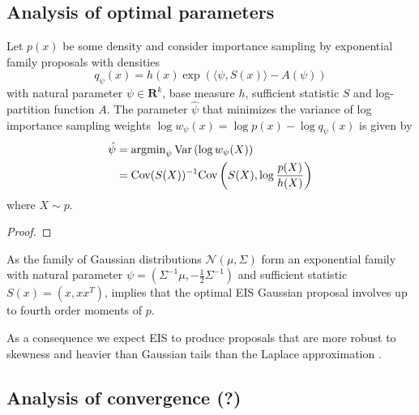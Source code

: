 \begin{tcolorbox}[title={decide what to do}]
    
\subsection{Analysis of optimal parameters}
\label{subsec:analysis_of_optimal_parameters}


\begin{theorem}
    \label{thm:optimal-eis}
    Let $p(x)$ be some density and consider importance sampling by exponential family proposals with densities $$q_\psi(x) = h(x) \exp\left( \langle \psi,S(x)\rangle - A(\psi)\right)$$ with natural parameter $\psi \in \mathbf{R}^{k}$, base measure $h$, sufficient statistic $S$ and log-partition function $A$. The parameter $\hat \psi$ that minimizes the variance of log importance sampling weights $\log w_{\psi}(x) = \log p(x) - \log q_{\psi}(x)$ is given by
    \begin{align*}
        \hat \psi & =  \operatorname{argmin} _{\psi} \text{Var} \left( \log w_{\psi}(X) \right)        \\
                  & = \text{Cov}(S(X))^{-1}\text{Cov}\left(S(X), \log \frac{p(X)}{h(X)}\right)
    \end{align*}
    where $X \sim p$.
\end{theorem}
\begin{proof}
\end{proof}

\begin{remark}
    As the family of Gaussian distributions $\mathcal N \left( \mu, \Sigma \right)$ form an exponential family with natural parameter $\psi = \left( \Sigma ^{-1} \mu, -\frac{1}{2}\Sigma^{-1} \right)$ and sufficient statistic $S(x) = \left( x, x x^{T} \right)$,  implies that the optimal EIS Gaussian proposal involves up to fourth order moments of $p$.

    As a consequence we expect EIS to produce proposals that are more robust to skewness and heavier than Gaussian tails than the Laplace approximation .
\end{remark}

\subsection{Analysis of convergence (?)}
\label{subsec:analysis-of-convergence}


\end{tcolorbox}
